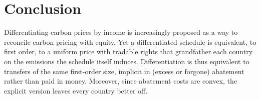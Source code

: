 \documentclass[12pt,english]{article}
\theoremstyle{remark}
\begin{document}

\FloatBarrier

\section{Conclusion}
\label{sec:conclusion}

Differentiating carbon prices by income is increasingly proposed as a way to reconcile carbon pricing with equity. %
Yet a differentiated schedule is equivalent, to first order, to a uniform price with tradable rights that grandfather each country on the emissions the schedule itself induces. Differentiation is thus equivalent to transfers of the same first-order size, implicit in (excess or forgone) abatement rather than paid in money. 
Moreover, since abatement costs are convex, the explicit version leaves every country better off.
\end{document}
